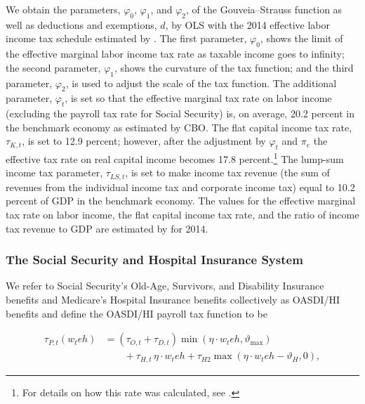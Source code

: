 \documentclass[11pt,leqno,fleqn]{article}
\begin{document}
We obtain the parameters, $\varphi_{0}$, $\varphi_{1}$, and $\varphi_{2}$, of the Gouveia--Strauss function as well as deductions and exemptions, $d$, by OLS with the 2014 effective labor income tax schedule estimated by \citet{CBO:2014a}. The first parameter, $\varphi_{0}$, shows the limit of the effective marginal labor income tax rate as taxable income goes to infinity; the second parameter, $\varphi_{1}$, shows the curvature of the tax function; and the third parameter, $\varphi_{2}$, is used to adjust the scale of the tax function. The additional parameter, $\varphi_{t}$, is set so that the effective marginal tax rate on labor income (excluding the payroll tax rate for Social Security) is, on average, 20.2 percent in the benchmark economy as estimated by CBO. The flat capital income tax rate, $\tau_{K,t}$, is set to 12.9 percent; however, after the adjustment by $\varphi_t$ and $\pi_e$ the effective tax rate on real capital income becomes 17.8 percent.\footnote{For details on how this rate was calculated, see \citet{CBO:2014c}.} The lump-sum income tax parameter, $\tau_{LS,t}$, is set to make income tax revenue (the sum of revenues from the individual income tax and corporate income tax) equal to 10.2 percent of GDP in the benchmark economy. The values for the effective marginal tax rate on labor income, the flat capital income tax rate, and the ratio of income tax revenue to GDP are estimated by \citet{CBO:2014a} for 2014.

	

\subsubsection{The Social Security and Hospital Insurance System}

We refer to Social Security's Old-Age, Survivors, and Disability Insurance benefits and Medicare’s Hospital Insurance benefits collectively as OASDI/HI benefits and define the OASDI/HI payroll tax function to be

\begin{align*}
\tau_{P,t}(w_{t}eh)&=(\tau_{O,t}+\tau_{D,t})
\min(\eta\!\cdot\!w_{t}eh,\vartheta_{\max})\\
&\qquad+\tau_{H,t}\,\eta\!\cdot\!w_{t}eh
+\tau_{H2}\max(\eta\!\cdot\!w_{t}eh-\vartheta_{H},0),
\end{align*}
\end{document}
